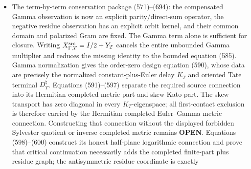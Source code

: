 \documentclass[11pt]{article}
\newcommand{\OPEN}{\textcolor{red!70!black}{\textbf{OPEN}}}
\begin{document}
\begin{itemize}
      is proved completely observable in finitely many boundary passes in
      (570e)--(570g), and Möbius preconditioning gives the explicit
      contraction (570h)--(570i).  The physical Wigner--Smith prime factor
      has the opposite signed-delay orientation.  Equations (570j)--(570l)
      prove that its winding correction converts the positive one-sided
      Julia defect into a right-minus-left Krein boundary flux, which
      vanishes identically on parity sources.  Transferring strict
      observability without changing \(A_T\) therefore requires a genuinely
      joint Gamma--Tate source intertwiner.  The finite-dimensional
      countermodel (570m) additionally proves that injectivity of a Gamma
      \emph{input} feature cannot exclude angular equality unless that
      feature is first placed inside the angular defect by a source-derived
      factorization.  Finally (570n)--(570p) separate two notions that may
      not be interchanged: the compressed scattering norm defect and the
      stored Wigner--Smith delay.  The former can be completely observable
      while the latter remains sign-indefinite; \(A_T\) is the latter.
\item The term-by-term conservation package (571)--(694): the compensated
      Gamma observation is now an explicit parity/direct-sum operator, the
      negative residue observation has an explicit orbit kernel, and their
      common domain and polarized Gram are fixed.  The Gamma term alone is
      sufficient for closure.  Writing
      \(X_{\Gamma,T}^{\rm src}=I/2+Y_T\) cancels the entire unbounded Gamma
      multiplier and reduces the missing identity to the bounded equation
      (585).  Gamma normalization gives the order-zero design equation
      (590), whose data are precisely the normalized constant-plus-Euler
      delay \(K_T\) and oriented Tate terminal \(D_T^\natural\).
      Equations (591)--(597) separate the required source connection into
      its Hermitian completed-metric part and skew Kato part.  The skew
      transport has zero diagonal in every \(K_T\)-eigenspace; all
      first-contact exclusion is therefore carried by the Hermitian
      completed Euler--Gamma metric connection.  Constructing that
      connection without the displayed forbidden Sylvester quotient or
      inverse completed metric remains \OPEN{}.  Equations (598)--(600)
      construct its honest half-plane logarithmic connection and prove that
      critical continuation necessarily adds the completed finite-part plus
      residue graph; the antisymmetric residue coordinate is exactly

\end{itemize}
\end{document}

